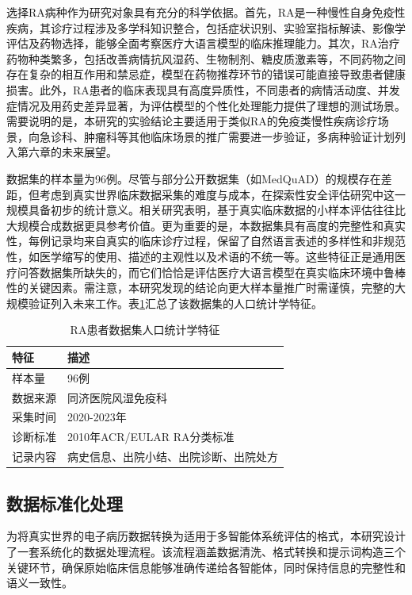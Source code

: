 选择RA病种作为研究对象具有充分的科学依据。首先，RA是一种慢性自身免疫性疾病，其诊疗过程涉及多学科知识整合，包括症状识别、实验室指标解读、影像学评估及药物选择，能够全面考察医疗大语言模型的临床推理能力。其次，RA治疗药物种类繁多，包括改善病情抗风湿药、生物制剂、糖皮质激素等，不同药物之间存在复杂的相互作用和禁忌症，模型在药物推荐环节的错误可能直接导致患者健康损害。此外，RA患者的临床表现具有高度异质性，不同患者的病情活动度、并发症情况及用药史差异显著，为评估模型的个性化处理能力提供了理想的测试场景。需要说明的是，本研究的实验结论主要适用于类似RA的免疫类慢性疾病诊疗场景，向急诊科、肿瘤科等其他临床场景的推广需要进一步验证，多病种验证计划列入第六章的未来展望。

数据集的样本量为96例。尽管与部分公开数据集（如MedQuAD）的规模存在差距，但考虑到真实世界临床数据采集的难度与成本，在探索性安全评估研究中这一规模具备初步的统计意义。相关研究表明，基于真实临床数据的小样本评估往往比大规模合成数据更具参考价值\cite{johnson2016mimic}。更为重要的是，本数据集具有高度的完整性和真实性，每例记录均来自真实的临床诊疗过程，保留了自然语言表述的多样性和非规范性，如医学缩写的使用、描述的主观性以及术语的不统一等。这些特征正是通用医疗问答数据集所缺失的，而它们恰恰是评估医疗大语言模型在真实临床环境中鲁棒性的关键因素。需注意，本研究发现的结论向更大样本量推广时需谨慎，完整的大规模验证列入未来工作。表\ref{tab:ra-demographics}汇总了该数据集的人口统计学特征。


\begin{table}[htbp]
\centering
\caption{RA患者数据集人口统计学特征}
\label{tab:ra-demographics}
\begin{tabular}{ll}
\toprule
特征 & 描述 \\
\midrule
样本量 & 96例 \\
数据来源 & 同济医院风湿免疫科 \\
采集时间 & 2020-2023年 \\
诊断标准 & 2010年ACR/EULAR RA分类标准 \\
记录内容 & 病史信息、出院小结、出院诊断、出院处方 \\
\bottomrule
\end{tabular}
\end{table}

\subsection{数据标准化处理}

为将真实世界的电子病历数据转换为适用于多智能体系统评估的格式，本研究设计了一套系统化的数据处理流程。该流程涵盖数据清洗、格式转换和提示词构造三个关键环节，确保原始临床信息能够准确传递给各智能体，同时保持信息的完整性和语义一致性。

